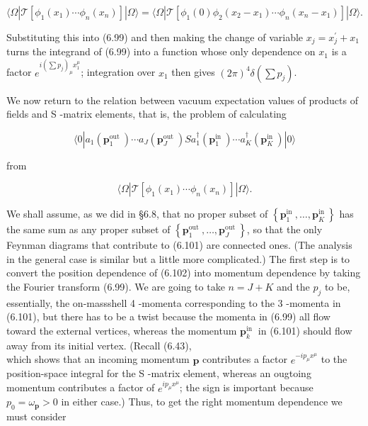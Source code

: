 \documentclass[10pt, letterpaper]{article}
\begin{document}
$$
\langle\Omega| \mathcal{T}\left[\phi_{1}\left(x_{1}\right) \cdots \phi_{n}\left(x_{n}\right)\right]|\Omega\rangle=\langle\Omega| \mathcal{T}\left[\phi_{1}(0) \phi_{2}\left(x_{2}-x_{1}\right) \cdots \phi_{n}\left(x_{n}-x_{1}\right)\right]|\Omega\rangle .
$$

Substituting this into (6.99) and then making the change of variable $x_{j}=x_{j}^{\prime}+x_{1}$ turns the integrand of (6.99) into a function whose only dependence on $x_{1}$ is a factor $e^{i\left(\sum p_{j}\right)_{\mu} x_{1}^{\mu}}$; integration over $x_{1}$ then gives $(2 \pi)^{4} \delta\left(\sum p_{j}\right)$.

We now return to the relation between vacuum expectation values of products of fields and S -matrix elements, that is, the problem of calculating

$$
\langle 0| a_{1}\left(\mathbf{p}_{1}^{\text {out }}\right) \cdots a_{J}\left(\mathbf{p}_{J}^{\text {out }}\right) S a_{1}^{\dagger}\left(\mathbf{p}_{1}^{\text {in }}\right) \cdots a_{K}^{\dagger}\left(\mathbf{p}_{K}^{\text {in }}\right)|0\rangle
$$

from

$$
\langle\Omega| \mathcal{T}\left[\phi_{1}\left(x_{1}\right) \cdots \phi_{n}\left(x_{n}\right)\right]|\Omega\rangle .
$$

We shall assume, as we did in §6.8, that no proper subset of $\left\{\mathbf{p}_{1}^{\text {in }}, \ldots, \mathbf{p}_{K}^{\text {in }}\right\}$ has the same sum as any proper subset of $\left\{\mathbf{p}_{1}^{\text {out }}, \ldots, \mathbf{p}_{J}^{\text {out }}\right\}$, so that the only Feynman diagrams that contribute to (6.101) are connected ones. (The analysis in the general case is similar but a little more complicated.) The first step is to convert the position dependence of (6.102) into momentum dependence by taking the Fourier transform (6.99). We are going to take $n=J+K$ and the $p_{j}$ to be, essentially, the on-massshell 4 -momenta corresponding to the 3 -momenta in (6.101), but there has to be a twist because the momenta in (6.99) all flow toward the external vertices, whereas the momentum $\mathbf{p}_{k}^{\text {in }}$ in (6.101) should flow away from its initial vertex. (Recall (6.43),\\
which shows that an incoming momentum $\mathbf{p}$ contributes a factor $e^{-i p_{\mu} x^{\mu}}$ to the position-space integral for the S -matrix element, whereas an ougtoing momentum contributes a factor of $e^{i p_{\mu} x^{\mu}}$; the sign is important because $p_{0}=\omega_{\mathbf{p}}>0$ in either case.) Thus, to get the right momentum dependence we must consider
\end{document}
